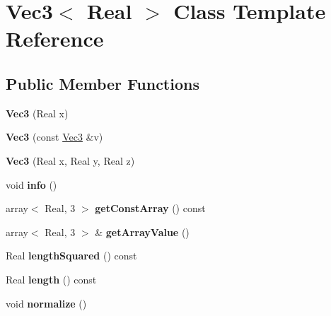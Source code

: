 \hypertarget{classVec3}{\section{Vec3$<$ Real $>$ Class Template Reference}
\label{classVec3}
}
\subsection*{Public Member Functions}
\begin{DoxyCompactItemize}
\item 
\hypertarget{classVec3_a40270459959ea12c3a73172553571502}{{\bfseries Vec3} (Real x)}\label{classVec3_a40270459959ea12c3a73172553571502}

\item 
\hypertarget{classVec3_a3b0cbc48641f14f5db5f0a62ec03f4a8}{{\bfseries Vec3} (const \hyperlink{classVec3}{Vec3} \&v)}\label{classVec3_a3b0cbc48641f14f5db5f0a62ec03f4a8}

\item 
\hypertarget{classVec3_a0f8829f15408bffed0acd00c3633a88a}{{\bfseries Vec3} (Real x, Real y, Real z)}\label{classVec3_a0f8829f15408bffed0acd00c3633a88a}

\item 
\hypertarget{classVec3_a318360b79f81af3bf38b0f9ecc1f8241}{void {\bfseries info} ()}\label{classVec3_a318360b79f81af3bf38b0f9ecc1f8241}

\item 
\hypertarget{classVec3_aa4cc774bda0f815f1255e7e9811c60bd}{array$<$ Real, 3 $>$ {\bfseries get\+Const\+Array} () const }\label{classVec3_aa4cc774bda0f815f1255e7e9811c60bd}

\item 
\hypertarget{classVec3_ac3988e58a6700a06f3769c6196352021}{array$<$ Real, 3 $>$ \& {\bfseries get\+Array\+Value} ()}\label{classVec3_ac3988e58a6700a06f3769c6196352021}

\item 
\hypertarget{classVec3_ab18985db74e6d5453d7224ed13a20ef6}{Real {\bfseries length\+Squared} () const }\label{classVec3_ab18985db74e6d5453d7224ed13a20ef6}

\item 
\hypertarget{classVec3_a8d5375d8d05372b39960cb25f934d923}{Real {\bfseries length} () const }\label{classVec3_a8d5375d8d05372b39960cb25f934d923}

\item 
\hypertarget{classVec3_ad55b7dde59612786b87f56912ff5656a}{void {\bfseries normalize} ()}\label{classVec3_ad55b7dde59612786b87f56912ff5656a}


\end{DoxyCompactItemize}
